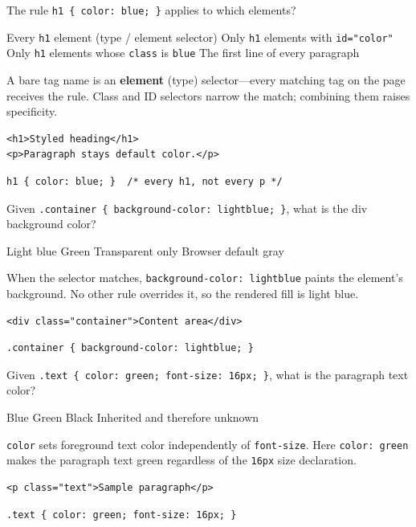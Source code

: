 \question[4]
The rule \texttt{h1 \{ color: blue; \}} applies to which elements?
\begin{choices}
  \CorrectChoice Every \texttt{h1} element (type / element selector)
  \choice Only \texttt{h1} elements with \texttt{id="color"}
  \choice Only \texttt{h1} elements whose \texttt{class} is \texttt{blue}
  \choice The first line of every paragraph
\end{choices}
\begin{solution}
  A bare tag name is an \textbf{element} (type) selector---every matching tag on the page receives the rule. Class and ID selectors narrow the match; combining them raises specificity.
\begin{lstlisting}[style=htmlinline]
<h1>Styled heading</h1>
<p>Paragraph stays default color.</p>
\end{lstlisting}
\begin{lstlisting}[style=cssinline]
h1 { color: blue; }  /* every h1, not every p */
\end{lstlisting}
\end{solution}

\newpage

\question[4]
Given \texttt{.container \{ background-color: lightblue; \}}, what is the div background color?
\begin{choices}
  \CorrectChoice Light blue
  \choice Green
  \choice Transparent only
  \choice Browser default gray
\end{choices}
\begin{solution}
  When the selector matches, \texttt{background-color: lightblue} paints the element's background. No other rule overrides it, so the rendered fill is light blue.
\begin{lstlisting}[style=htmlinline]
<div class="container">Content area</div>
\end{lstlisting}
\begin{lstlisting}[style=cssinline]
.container { background-color: lightblue; }
\end{lstlisting}
\end{solution}

\question[4]
Given \texttt{.text \{ color: green; font-size: 16px; \}}, what is the paragraph text color?
\begin{choices}
  \choice Blue
  \CorrectChoice Green
  \choice Black
  \choice Inherited and therefore unknown
\end{choices}
\begin{solution}
  \texttt{color} sets foreground text color independently of \texttt{font-size}. Here \texttt{color: green} makes the paragraph text green regardless of the \texttt{16px} size declaration.
\begin{lstlisting}[style=htmlinline]
<p class="text">Sample paragraph</p>
\end{lstlisting}
\begin{lstlisting}[style=cssinline]
.text { color: green; font-size: 16px; }
\end{lstlisting}
\end{solution}

